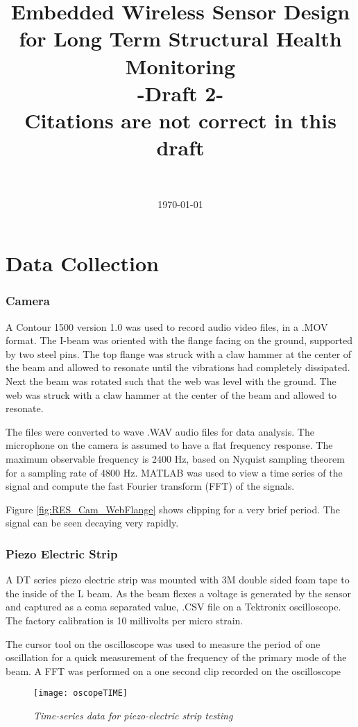 \documentclass[12pt]{report}
\title{\vspace{-8mm}
	\fontsize{20pt}{10pt}\selectfont
	\textbf{Embedded Wireless Sensor Design for Long Term Structural Health Monitoring\\ \vspace{5mm}\fontsize{16}{10}\selectfont\textbf{-Draft 2-\\\textbf{Citations are not correct in this draft}}}
	}
\author{%
	\large
	\textsc{ }\\
	}
\date{\normalsize\vspace{-3mm}\today}
\begin{document}
\chapter{Data Collection}
\subsection{Camera}
\indent A Contour 1500 version 1.0 was used to record audio video files, in a .MOV format. The I-beam was oriented with the flange facing on the ground, supported by two steel pins. The top flange was struck with a claw hammer at the center of the beam and allowed to resonate until the vibrations had completely dissipated. Next the beam was rotated such that the web was level with the ground. The web was struck with a claw hammer at the center of the beam and allowed to resonate. 

\indent The files were converted to wave .WAV audio files for data analysis. The microphone on the camera is assumed to have a flat frequency response. The maximum observable frequency is 2400 Hz, based on Nyquist sampling theorem for a sampling rate of 4800 Hz. MATLAB was used to view a time series of the signal and compute the fast Fourier transform (FFT) of the signals.

Figure \ref{fig:RES_Cam_WebFlange} shows clipping for a very brief period. The signal can be seen decaying very rapidly.

\subsection{Piezo Electric Strip}
\indent A DT series piezo electric strip was mounted with 3M double sided foam tape to the inside of the L beam. As the beam flexes a voltage is generated by the sensor and captured as a coma separated value, .CSV file on a Tektronix oscilloscope. The factory calibration is 10 millivolts per micro strain. 

\indent The cursor tool on the oscilloscope was used to measure the period of one oscillation for a quick measurement of the frequency of the primary mode of the beam. A FFT was performed on a one second clip recorded on the oscilloscope

\begin{figure}
\centering
\texttt{[image: oscopeTIME]}
\caption{\textit{Time-series data for piezo-electric strip testing}}
\label{fig:RES_PEST}
\end{figure}
\end{document}
